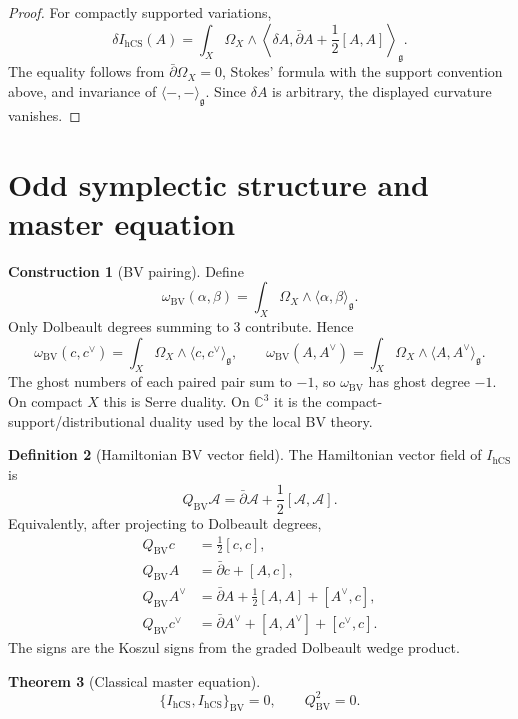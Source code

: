 \documentclass[11pt]{amsart}
\providecommand{\C}{\mathbb{C}}
\providecommand{\dbar}{\bar{\partial}}
\providecommand{\g}{\mathfrak{g}}
\providecommand{\hCS}{\mathrm{hCS}}
\providecommand{\BV}{\mathrm{BV}}
\theoremstyle{plain}
\newtheorem{theorem}{Theorem}[section]
\theoremstyle{definition}
\newtheorem{definition}[theorem]{Definition}
\newtheorem{construction}[theorem]{Construction}
\theoremstyle{remark}
\begin{document}
\begin{proof}
For compactly supported variations,
\[
  \delta I_{\hCS}(A)
  =
  \int_X\Omega_X\wedge
  \left\langle
    \delta A,\dbar A+\frac{1}{2}[A,A]
  \right\rangle_\g .
\]
The equality follows from \(\dbar\Omega_X=0\), Stokes' formula with the
support convention above, and invariance of
\(\langle-,-\rangle_\g\). Since \(\delta A\) is arbitrary, the displayed
curvature vanishes.
\end{proof}

\section{Odd symplectic structure and master equation}

\begin{construction}[BV pairing]
Define
\[
  \omega_{\BV}(\alpha,\beta)
  =
  \int_X \Omega_X\wedge \langle \alpha,\beta\rangle_\g .
\]
Only Dolbeault degrees summing to \(3\) contribute. Hence
\[
  \omega_{\BV}(c,c^\vee)
  =
  \int_X \Omega_X\wedge\langle c,c^\vee\rangle_\g,
  \qquad
  \omega_{\BV}(A,A^\vee)
  =
  \int_X \Omega_X\wedge\langle A,A^\vee\rangle_\g .
\]
The ghost numbers of each paired pair sum to \(-1\), so
\(\omega_{\BV}\) has ghost degree \(-1\). On compact \(X\) this is
Serre duality. On \(\C^3\) it is the compact-support/distributional
duality used by the local BV theory.
\end{construction}

\begin{definition}[Hamiltonian BV vector field]
The Hamiltonian vector field of \(I_{\hCS}\) is
\[
  Q_{\BV}\mathcal A
  =
  \dbar\mathcal A+\frac{1}{2}[\mathcal A,\mathcal A].
\]
Equivalently, after projecting to Dolbeault degrees,
\[
\begin{aligned}
  Q_{\BV}c &= \frac{1}{2}[c,c],\\
  Q_{\BV}A &= \dbar c+[A,c],\\
  Q_{\BV}A^\vee &= \dbar A+\frac{1}{2}[A,A]+[A^\vee,c],\\
  Q_{\BV}c^\vee &= \dbar A^\vee+[A,A^\vee]+[c^\vee,c].
\end{aligned}
\]
The signs are the Koszul signs from the graded Dolbeault wedge product.
\end{definition}

\begin{theorem}[Classical master equation]
\[
  \{I_{\hCS},I_{\hCS}\}_{\BV}=0,
  \qquad
  Q_{\BV}^2=0 .
\]
\end{theorem}
\end{document}
